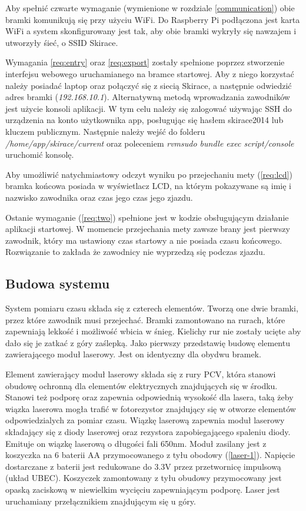 \documentclass[11pt,a4paper, twoside]{article}
\begin{document}
Aby spełnić czwarte wymaganie (wymienione w rozdziale \ref{communication}) obie bramki komunikują się przy użyciu WiFi. Do Raspberry Pi podłączona jest karta WiFi a system skonfigurowany jest tak, aby obie bramki wykryły się nawzajem i utworzyły śieć, o SSID Skirace.

Wymagania \ref{req:entry} oraz \ref{req:export} zostały spełnione poprzez stworzenie interfejsu webowego uruchamianego na bramce startowej. Aby z niego korzystać należy posiadać laptop oraz połączyć się z siecią Skirace, a następnie odwiedzić adres bramki (\emph{192.168.10.1}). Alternatywną metodą wprowadzania zawodników jest użycie konsoli aplikacji. W tym celu należy się zalogować używając SSH do urządzenia na konto użytkownika app, posługując się hasłem skirace2014 lub kluczem publicznym. Następnie należy wejść do folderu \emph{/home/app/skirace/current} oraz poleceniem \emph{rvmsudo bundle exec script/console} uruchomić konsolę. 

Aby umożliwić natychmiastowy odczyt wyniku po przejechaniu mety (\ref{req:lcd}) bramka końcowa posiada w wyświetlacz LCD, na którym pokazywane są imię i nazwisko zawodnika oraz czas jego czas jego zjazdu. 

Ostanie wymaganie (\ref{req:two}) spełnione jest w kodzie obsługującym działanie aplikacji startowej. W momencie przejechania mety zawsze brany jest pierwszy zawodnik, który ma ustawiony czas startowy a nie posiada czasu końcowego. Rozwiązanie to zakłada że zawodnicy nie wyprzedzą się podczas zjazdu.
\subsection{Budowa systemu}
System pomiaru czasu składa się z czterech elementów. Tworzą one dwie bramki, przez które zawodnik musi przejechać. Bramki zamontowano na rurach, które zapewniają lekkość i możliwość wbicia w śnieg. Kielichy rur nie zostały ucięte aby dało się je zatkać z góry zaślepką. Jako pierwszy przedstawię budowę elementu zawierającego moduł laserowy. Jest on identyczny dla obydwu bramek.

Element zawierający moduł laserowy składa się z rury PCV, która stanowi obudowę ochronną dla elementów elektrycznych znajdujących się w środku. Stanowi też podporę oraz zapewnia odpowiednią wysokość dla lasera, taką żeby wiązka laserowa mogła trafić w fotorezystor znajdujący się w otworze elementów odpowiedzialych za pomiar czasu. Wiązkę laserową zapewnia moduł laserowy składający się z diody laserowej oraz rezystora zapobiegającego spaleniu diody. Emituje on wiązkę laserową o długości fali 650nm. Moduł zasilany jest z koszyczka na 6 baterii AA przymocowanego z tyłu obodowy (\ref{laser-1}). Napięcie dostarczane z baterii jest redukowane do 3.3V przez przetwornicę impulsową (układ UBEC). Koszyczek zamontowany z tyłu obudowy przymocowany jest opaską zaciskową w niewielkim wycięciu zapewniającym podporę. Laser jest uruchamiany przełącznikiem znajdującym się u góry. 
\end{document}

